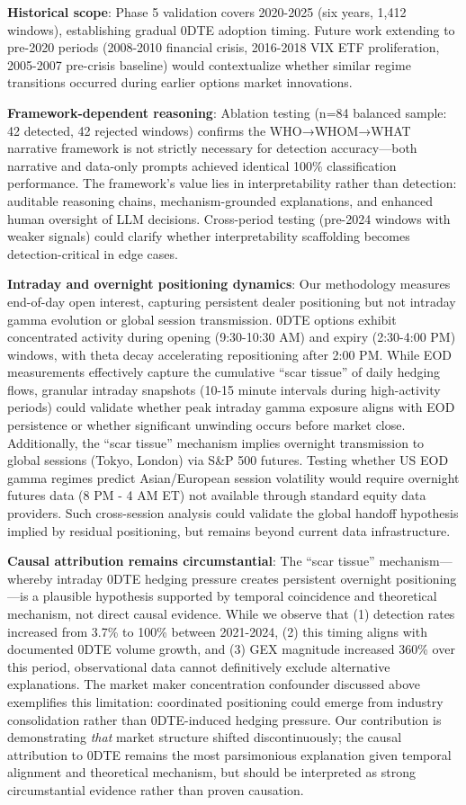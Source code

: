 \textbf{Historical scope}: Phase 5 validation covers 2020-2025 (six years, 1,412 windows), establishing gradual 0DTE adoption timing. Future work extending to pre-2020 periods (2008-2010 financial crisis, 2016-2018 VIX ETF proliferation, 2005-2007 pre-crisis baseline) would contextualize whether similar regime transitions occurred during earlier options market innovations.

\textbf{Framework-dependent reasoning}: Ablation testing (n=84 balanced sample: 42 detected, 42 rejected windows) confirms the WHO→WHOM→WHAT narrative framework is not strictly necessary for detection accuracy—both narrative and data-only prompts achieved identical 100\% classification performance. The framework's value lies in interpretability rather than detection: auditable reasoning chains, mechanism-grounded explanations, and enhanced human oversight of LLM decisions. Cross-period testing (pre-2024 windows with weaker signals) could clarify whether interpretability scaffolding becomes detection-critical in edge cases.

\textbf{Intraday and overnight positioning dynamics}: Our methodology measures end-of-day open interest, capturing persistent dealer positioning but not intraday gamma evolution or global session transmission. 0DTE options exhibit concentrated activity during opening (9:30-10:30 AM) and expiry (2:30-4:00 PM) windows, with theta decay accelerating repositioning after 2:00 PM. While EOD measurements effectively capture the cumulative ``scar tissue'' of daily hedging flows, granular intraday snapshots (10-15 minute intervals during high-activity periods) could validate whether peak intraday gamma exposure aligns with EOD persistence or whether significant unwinding occurs before market close. Additionally, the ``scar tissue'' mechanism implies overnight transmission to global sessions (Tokyo, London) via S\&P 500 futures. Testing whether US EOD gamma regimes predict Asian/European session volatility would require overnight futures data (8 PM - 4 AM ET) not available through standard equity data providers. Such cross-session analysis could validate the global handoff hypothesis implied by residual positioning, but remains beyond current data infrastructure.

\textbf{Causal attribution remains circumstantial}: The ``scar tissue'' mechanism—whereby intraday 0DTE hedging pressure creates persistent overnight positioning—is a plausible hypothesis supported by temporal coincidence and theoretical mechanism, not direct causal evidence. While we observe that (1) detection rates increased from 3.7\% to 100\% between 2021-2024, (2) this timing aligns with documented 0DTE volume growth, and (3) GEX magnitude increased 360\% over this period, observational data cannot definitively exclude alternative explanations. The market maker concentration confounder discussed above exemplifies this limitation: coordinated positioning could emerge from industry consolidation rather than 0DTE-induced hedging pressure. Our contribution is demonstrating \textit{that} market structure shifted discontinuously; the causal attribution to 0DTE remains the most parsimonious explanation given temporal alignment and theoretical mechanism, but should be interpreted as strong circumstantial evidence rather than proven causation.

